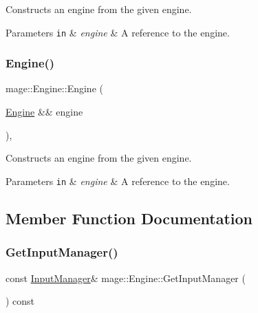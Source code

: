 Constructs an engine from the given engine.


\begin{DoxyParams}[1]{Parameters}
\mbox{\tt in}  & {\em engine} & A reference to the engine. \\
\hline
\end{DoxyParams}
\hypertarget{classmage_1_1_engine_a275b668202a24e639ebe3056a1c845a3}{}\label{classmage_1_1_engine_a275b668202a24e639ebe3056a1c845a3} 
\subsubsection{\texorpdfstring{Engine()}{Engine()}\hspace{0.1cm}{\footnotesize\ttfamily [3/3]}}
{\footnotesize\ttfamily mage\+::\+Engine\+::\+Engine (\begin{DoxyParamCaption}\item[{\hyperlink{classmage_1_1_engine}{Engine} \&\&}]{engine }\end{DoxyParamCaption})\hspace{0.3cm}{\ttfamily [private]}, {\ttfamily [delete]}}

Constructs an engine from the given engine.


\begin{DoxyParams}[1]{Parameters}
\mbox{\tt in}  & {\em engine} & A reference to the engine. \\
\hline
\end{DoxyParams}


\subsection{Member Function Documentation}
\hypertarget{classmage_1_1_engine_a728ad054d36cee8eaf9ee3eb6c1e1201}{}\label{classmage_1_1_engine_a728ad054d36cee8eaf9ee3eb6c1e1201} 
\subsubsection{\texorpdfstring{Get\+Input\+Manager()}{GetInputManager()}}
{\footnotesize\ttfamily const \hyperlink{classmage_1_1_input_manager}{Input\+Manager}\& mage\+::\+Engine\+::\+Get\+Input\+Manager (\begin{DoxyParamCaption}{ }\end{DoxyParamCaption}) const}

